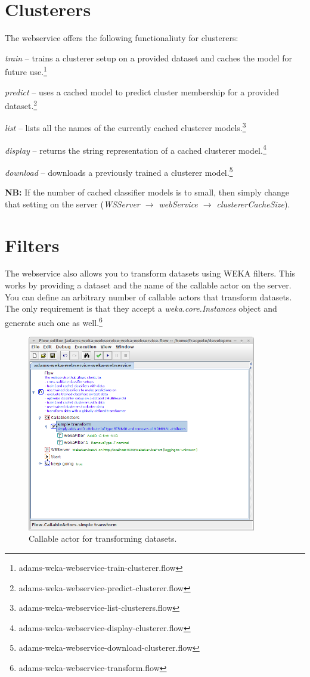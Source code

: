 \documentclass[a4paper]{book}
\begin{document}
\section{Clusterers}
The webservice offers the following functionaliuty for clusterers:
\begin{tight_itemize}
	\item \textit{train} -- trains a clusterer setup on a provided dataset 
	and caches the model for future use.\footnote{adams-weka-webservice-train-clusterer.flow}
	\item \textit{predict} -- uses a cached model to predict cluster membership
	for	a provided dataset.\footnote{adams-weka-webservice-predict-clusterer.flow}
	\item \textit{list} -- lists all the names of the currently cached clusterer
	models.\footnote{adams-weka-webservice-list-clusterers.flow}
	\item \textit{display} -- returns the string representation of a cached
	clusterer model.\footnote{adams-weka-webservice-display-clusterer.flow}
	\item \textit{download} -- downloads a previously trained a clusterer 
	model.\footnote{adams-weka-webservice-download-clusterer.flow}
\end{tight_itemize}
\textbf{NB:} If the number of cached classifier models is to small, then simply 
change that setting on the server 
(\textit{WSServer $\rightarrow$ webService $\rightarrow$ clustererCacheSize}).

\section{Filters}
The webservice also allows you to transform datasets using WEKA filters. This
works by providing a dataset and the name of the callable actor on the server.
You can define an arbitrary number of callable actors that transform datasets.
The only requirement is that they accept a \textit{weka.core.Instances} object
and generate such one as well.\footnote{adams-weka-webservice-transform.flow}

\begin{figure}[htb]
  \centering
  \includegraphics[width=10.0cm]{images/transform_callable_actor.png}
  \caption{Callable actor for transforming datasets.}
  \label{transform_callable_actor}
\end{figure}
\end{document}
